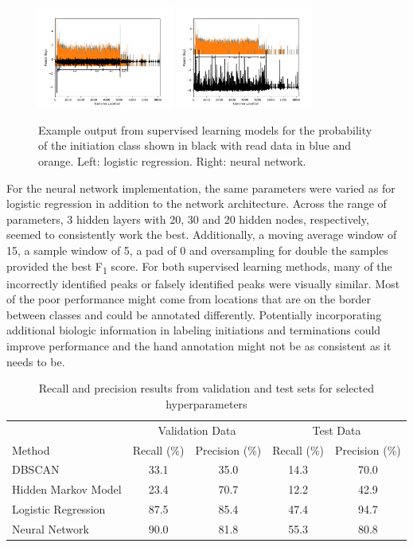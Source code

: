\documentclass{article}
\begin{document}
\begin{figure}[H]
    \centering
    \includegraphics[width=0.4\textwidth]{0_logreg_init.png}
    \includegraphics[width=0.4\textwidth]{0_nn_init.png}
    \caption{Example output from supervised learning models for the probability of the initiation class shown in black with read data in blue and orange.  Left: logistic regression. Right: neural network.}
    \label{fig:sup}
\end{figure}

For the neural network implementation, the same parameters were varied as for logistic regression in addition to the network architecture.  Across the range of parameters, 3 hidden layers with 20, 30 and 20 hidden nodes, respectively, seemed to consistently work the best.  Additionally, a moving average window of 15, a sample window of 5, a pad of 0 and oversampling for double the samples provided the best F\textsubscript{1} score.  For both supervised learning methods, many of the incorrectly identified peaks or falsely identified peaks were visually similar.  Most of the poor performance might come from locations that are on the border between classes and could be annotated differently.  Potentially incorporating additional biologic information in labeling initiations and terminations could improve performance and the hand annotation might not be as consistent as it needs to be. 

\begin{table}[H]
  \caption{Recall and precision results from validation and test sets for selected hyperparameters}
  \label{results}
  \centering
  \begin{tabular}{lcccc}
    \toprule
    & \multicolumn{2}{c}{Validation Data} & \multicolumn{2}{c}{Test Data} \\
    \cmidrule(r){2-3} \cmidrule(r){4-5}
    Method & Recall (\%) & Precision (\%) & Recall (\%) & Precision (\%) \\
    \midrule
    DBSCAN & 33.1 & 35.0 & 14.3 & 70.0 \\
    Hidden Markov Model & 23.4 & 70.7 & 12.2 & 42.9 \\
    Logistic Regression & 87.5 & 85.4 & 47.4 & 94.7 \\
    Neural Network & 90.0 & 81.8 & 55.3 & 80.8 \\
    \bottomrule
  \end{tabular}
\end{table}
\end{document}
